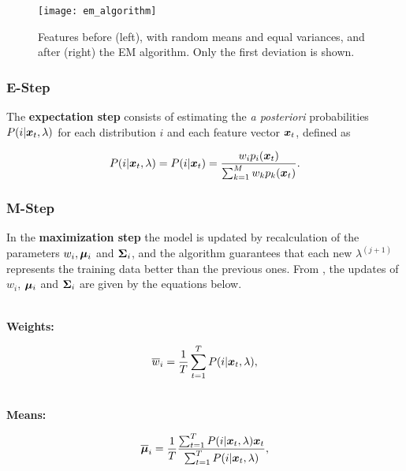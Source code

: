 \begin{figure}[ht]
    \centering
    \texttt{[image: em\_algorithm]}
    \caption{Features before (left), with random means and equal variances, and after (right) the EM algorithm. Only the first deviation is shown.}
    \label{fig:em_algorithm}
\end{figure}

\subsubsection*{E-Step}

The \textbf{expectation step} consists of estimating the \emph{a posteriori} probabilities $P(i|\boldsymbol{x}_t, \lambda)$ for each distribution $i$ and each feature vector $\boldsymbol{x}_t$, defined as

\begin{equation}
    \postprob{i}{\dvec{x}_t, \lambda} = \postprob{i}{\dvec{x}_t} = \frac{w_i p_i(\dvec{x}_t)}{\sum_{k=1}^M w_k p_k(\dvec{x}_t)}.
    \label{eq:e-step-posterior}
\end{equation}

\subsubsection*{M-Step}

In the \textbf{maximization step} the model is updated by recalculation of the parameters $w_i, \boldsymbol{\mu}_i$ and $\boldsymbol{\Sigma}_i$, and the algorithm guarantees that each new $\lambda^{(j+1)}$ represents the training data better than the previous ones. From , the updates of $w_i$, $\boldsymbol{\mu}_i$ and $\boldsymbol{\Sigma}_i$ are given by the equations below.

\noindent\\\textbf{Weights:}

\begin{equation}
    \overline{w}_i = \frac{1}{T} \sum_{t=1}^T \postprob{i}{\dvec{x}_t, \lambda},
    \label{eq:m-step-weight}
\end{equation}

\noindent\\\textbf{Means:}

\begin{equation}
    \overline{\dvec{\mu}}_i = \frac{1}{T} \frac{\sum_{t=1}^T \postprob{i}{\dvec{x}_t, \lambda} \dvec{x}_t}{\sum_{t=1}^T \postprob{i}{\dvec{x}_t, \lambda}},
    \label{eq:m-step-means}
\end{equation}

